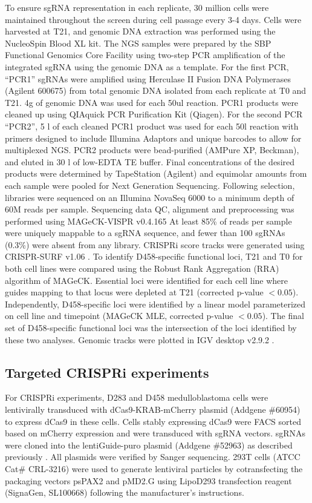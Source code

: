 To ensure sgRNA representation in each replicate, 30 million cells were maintained throughout the screen during cell passage every 3-4 days. Cells were harvested at T21, and genomic DNA extraction was performed using the NucleoSpin Blood XL kit. The NGS samples were prepared by the SBP Functional Genomics Core Facility using two-step PCR amplification of the integrated sgRNA using the genomic DNA as a template. For the first PCR, ``PCR1'' sgRNAs were amplified using Herculase II Fusion DNA Polymerases (Agilent 600675) from total genomic DNA isolated from each replicate at T0 and T21. 4\textmugreek g of genomic DNA was used for each 50ul reaction. PCR1 products were cleaned up using QIAquick PCR Purification Kit (Qiagen). For the second PCR ``PCR2'', 5 \textmugreek l of each cleaned PCR1 product was used for each 50\textmugreek l reaction with primers designed to include Illumina Adaptors and unique barcodes to allow for multiplexed NGS. PCR2 products were bead-purified (AMPure XP, Beckman), and eluted in 30 \textmugreek l of low-EDTA TE buffer. Final concentrations of the desired products were determined by TapeStation (Agilent) and equimolar amounts from each sample were pooled for Next Generation Sequencing.
Following selection, libraries were sequenced on an Illumina NovaSeq 6000 to a minimum depth of 60M reads per sample. Sequencing data QC, alignment and preprocessing was performed using MAGeCK-VISPR v0.4.165 \cite{mageck} At least 85\% of reads per sample were uniquely mappable to a sgRNA sequence, and fewer than 100 sgRNAs (0.3\%) were absent from any library. CRISPRi score tracks were generated using CRISPR-SURF v1.06 \cite{crispr-surf}. To identify D458-specific functional loci, T21 and T0 for both cell lines were compared using the Robust Rank Aggregation (RRA) algorithm of MAGeCK. Essential loci were identified for each cell line where guides mapping to that locus were depleted at T21 (corrected p-value $< 0.05$). Independently, D458-specific loci were identified by a linear model parameterized on cell line and timepoint (MAGeCK MLE, corrected p-value $< 0.05$). The final set of D458-specific functional loci was the intersection of the loci identified by these two analyses. Genomic tracks were plotted in IGV desktop v2.9.2 \cite{igv}.

\subsection{Targeted CRISPRi experiments}
For CRISPRi experiments, D283 and D458 medulloblastoma cells were lentivirally transduced with dCas9-KRAB-mCherry plasmid \cite{crispri} (Addgene \#60954) to express dCas9 in these cells. Cells stably expressing dCas9 were FACS sorted based on mCherry expression and were transduced with sgRNA vectors. sgRNAs were cloned into the lentiGuide-puro plasmid (Addgene \#52963) as described previously \cite{dixit_2021}. All plasmids were verified by Sanger sequencing. 293T cells (ATCC Cat\# CRL-3216) were used to generate lentiviral particles by cotransfecting the packaging vectors psPAX2 and pMD2.G using LipoD293 transfection reagent (SignaGen, SL100668) following the manufacturer's instructions.

